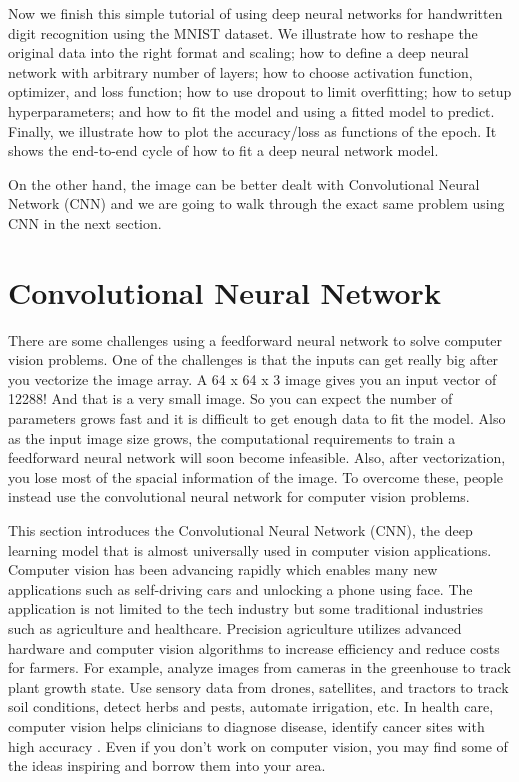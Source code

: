 \documentclass[
  12pt,
]{krantz}
\begin{document}
Now we finish this simple tutorial of using deep neural networks for handwritten digit recognition using the MNIST dataset. We illustrate how to reshape the original data into the right format and scaling; how to define a deep neural network with arbitrary number of layers; how to choose activation function, optimizer, and loss function; how to use dropout to limit overfitting; how to setup hyperparameters; and how to fit the model and using a fitted model to predict. Finally, we illustrate how to plot the accuracy/loss as functions of the epoch. It shows the end-to-end cycle of how to fit a deep neural network model.

On the other hand, the image can be better dealt with Convolutional Neural Network (CNN) and we are going to walk through the exact same problem using CNN in the next section.

\hypertarget{convolutional-neural-network}{%
\section{Convolutional Neural Network}\label{convolutional-neural-network}}

There are some challenges using a feedforward neural network to solve computer vision problems. One of the challenges is that the inputs can get really big after you vectorize the image array. A 64 x 64 x 3 image gives you an input vector of 12288! And that is a very small image. So you can expect the number of parameters grows fast and it is difficult to get enough data to fit the model. Also as the input image size grows, the computational requirements to train a feedforward neural network will soon become infeasible. Also, after vectorization, you lose most of the spacial information of the image. To overcome these, people instead use the convolutional neural network for computer vision problems.

This section introduces the Convolutional Neural Network (CNN), the deep learning model that is almost universally used in computer vision applications. Computer vision has been advancing rapidly which enables many new applications such as self-driving cars and unlocking a phone using face. The application is not limited to the tech industry but some traditional industries such as agriculture and healthcare. Precision agriculture utilizes advanced hardware and computer vision algorithms to increase efficiency and reduce costs for farmers. For example, analyze images from cameras in the greenhouse to track plant growth state. Use sensory data from drones, satellites, and tractors to track soil conditions, detect herbs and pests, automate irrigation, etc. In health care, computer vision helps clinicians to diagnose disease, identify cancer sites with high accuracy \citep{gloria2019}. Even if you don't work on computer vision, you may find some of the ideas inspiring and borrow them into your area.
\end{document}
